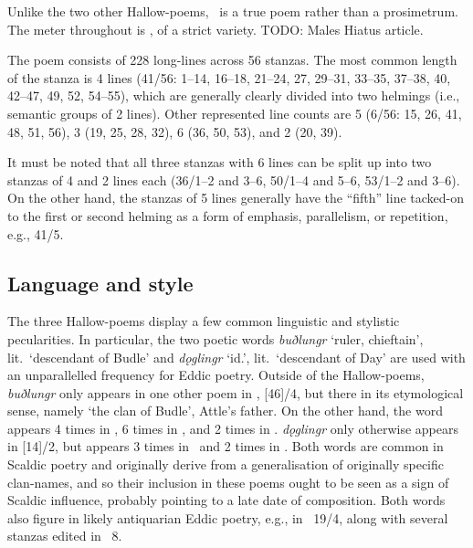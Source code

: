 Unlike the two other Hallow-poems, \HelgakvidaOne\ is a true poem rather than a prosimetrum.  The meter throughout is \Fornyrdislag, of a strict variety.  TODO: Males Hiatus article.

The poem consists of 228 long-lines across 56 stanzas.  The most common length of the stanza is 4 lines (41/56: 1--14, 16--18, 21--24, 27, 29--31, 33--35, 37--38, 40, 42--47, 49, 52, 54--55), which are generally clearly divided into two helmings (i.e., semantic groups of 2 lines).  Other represented line counts are 5 (6/56: 15, 26, 41, 48, 51, 56), 3 (19, 25, 28, 32), 6 (36, 50, 53), and 2 (20, 39).

It must be noted that all three stanzas with 6 lines can be split up into two stanzas of 4 and 2 lines each (36/1--2 and 3--6, 50/1--4 and 5--6, 53/1--2 and 3--6).  On the other hand, the stanzas of 5 lines generally have the “fifth” line tacked-on to the first or second helming as a form of emphasis, parallelism, or repetition, e.g., 41/5.

\subsection{Language and style}

The three Hallow-poems display a few common linguistic and stylistic pecularities.  In particular, the two poetic words \emph{buðlungr} ‘ruler, chieftain’, lit.~‘descendant of Budle’ and \emph{dǫglingr} ‘id.’, lit.~‘descendant of Day’ are used with an unparallelled frequency for Eddic poetry.  Outside of the Hallow-poems, \emph{buðlungr} only appears in one other poem in \Regius, [46]/4, but there in its etymological sense, namely ‘the clan of Budle’, Attle’s father.  On the other hand, the word appears 4 times in \HelgakvidaOne, 6 times in , and 2 times in .  \emph{dǫglingr} only otherwise appears in [14]/2, but appears 3 times in \HelgakvidaOne\ and 2 times in \HelgakvidaTwo.
Both words are common in Scaldic poetry and originally derive from a generalisation of originally specific clan-names, and so their inclusion in these poems ought to be seen as a sign of Scaldic influence, probably pointing to a late date of composition.  Both words also figure in likely antiquarian Eddic poetry, e.g., in \Grottasongr\ 19/4, along with several stanzas edited in \Skp\ 8.

\sectionline

\newpage

